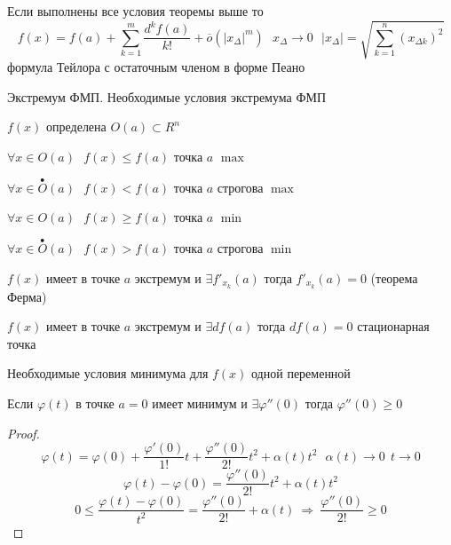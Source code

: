 \begin{block}
  Если выполнены все условия теоремы выше то
  $$
  f(x) = f(a) + \sum_{k=1}^m \frac{d^k f(a)}{k!} + \overline{o}(|x_{\Delta}|^m)
  ~~~ x_{\Delta} \to 0 ~~~ |x_{\Delta}| = \sqrt{\sum_{k=1}^n (x_{\Delta k})^2}
  $$
  формула Тейлора с остаточным членом в форме Пеано
\end{block}

\begin{title}[\Large]
  Экстремум ФМП. Необходимые условия экстремума ФМП
\end{title}

\begin{define}
  $f(x)$ определена $O(a) \subset R^n$

  $\forall x \in O(a) ~~~ f(x) \le f(a)$ точка $a$ $\max$

  $\forall x \in \stackrel{\bullet}{O}(a) ~~~ f(x) < f(a)$ точка $a$
  строгова $\max$

  $\forall x \in O(a) ~~~ f(x) \ge f(a)$ точка $a$ $\min$

  $\forall x \in \stackrel{\bullet}{O}(a) ~~~ f(x) > f(a)$ точка $a$
  строгова $\min$
\end{define}

\begin{theorem}
  $f(x)$ имеет в точке $a$ экстремум и $\exists f'_{x_k}(a)$ тогда
  $f'_{x_k}(a) = 0$ (теорема Ферма)
\end{theorem}

\begin{block}[Следствие]
  $f(x)$ имеет в точке $a$ экстремум и $\exists df(a)$ тогда $df(a) = 0$
  стационарная точка
\end{block}

\begin{block}[Лемма]
  Необходимые условия минимума для $f(x)$ одной переменной

  Если $\varphi(t)$ в точке $a=0$ имеет минимум и $\exists \varphi''(0)$
  тогда $\varphi''(0) \ge 0$
\end{block}

\begin{proof}
  $$
  \varphi(t) = \varphi(0) + \frac{\varphi'(0)}{1!}t +
  \frac{\varphi''(0)}{2!}t^2 + \alpha(t)t^2 ~~~ \alpha(t) \to 0 ~~ t \to 0
  $$
  $$
  \varphi(t) - \varphi(0) = \frac{\varphi''(0)}{2!}t^2 + \alpha(t)t^2
  $$
  $$
  0 \le \frac{\varphi(t) - \varphi(0)}{t^2} = \frac{\varphi''(0)}{2!} +
  \alpha(t) ~ \Rightarrow ~ \frac{\varphi''(0)}{2!} \ge 0
  $$
\end{proof}

